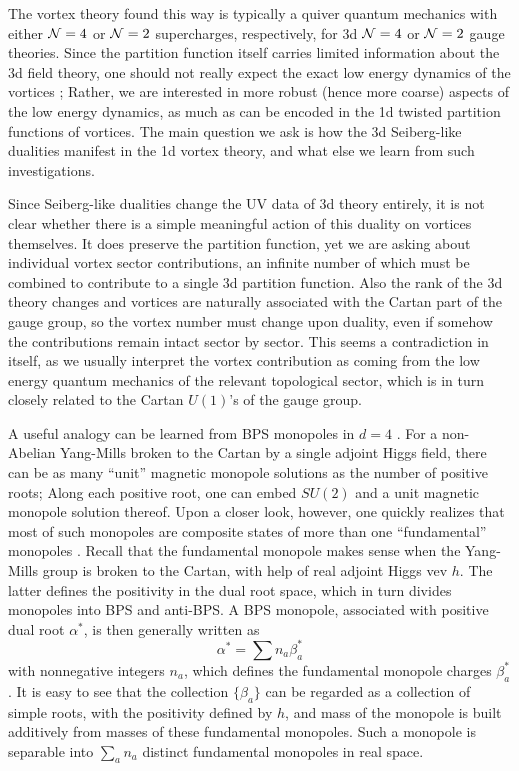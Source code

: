 \documentclass[a4paper,11pt]{article}
\begin{document}
The vortex theory found this way is typically a quiver quantum
mechanics with either ${\cal N}=4$ or ${\cal N}=2$ supercharges,
respectively, for 3d ${\cal N}=4$ or ${\cal N}=2$ gauge theories.
Since the partition function
itself carries limited information about the 3d field
theory, one should not really expect the exact low energy
dynamics of the vortices \cite{Hanany:2003hp};  Rather, we are
interested in more robust (hence more coarse) aspects of the
low energy dynamics, as much as can be encoded in the 1d twisted
partition functions of vortices. The main question we ask
is how the 3d Seiberg-like dualities manifest in the
1d vortex theory, and what else we learn from such
investigations.

Since Seiberg-like dualities change the UV data of 3d
theory entirely, it is not clear whether there is a simple
meaningful action of this duality on vortices themselves.
It does preserve the partition function, yet we are asking
about individual vortex sector contributions, an infinite number
of which must be combined to contribute to a single 3d
partition function. Also the rank of the 3d theory changes
and vortices are naturally associated with the Cartan
part of the gauge group, so the vortex number must change
upon duality, even if somehow the contributions remain
intact sector by sector. This seems a contradiction in
itself, as we usually interpret the vortex contribution
as coming from the low energy quantum mechanics of the
relevant topological sector, which is in turn closely
related to the Cartan $U(1)$'s of the gauge group.

A useful analogy can be learned from BPS monopoles in $d=4$ \cite{Weinberg:1982ev,Weinberg:2006rq}.
For a non-Abelian Yang-Mills broken to the Cartan by a single
adjoint Higgs field, there can be as many ``unit'' magnetic
monopole solutions as the number of positive roots; Along
each positive root, one can embed $SU(2)$ and a unit
magnetic monopole solution thereof. Upon a closer look, however,
one quickly realizes that most of such monopoles are
composite states of more than one ``fundamental'' monopoles \cite{Weinberg:1982ev}.
Recall that
the fundamental monopole makes sense when the Yang-Mills group is
broken to the Cartan, with help of real adjoint Higgs vev $h$.
The latter defines the positivity in the dual root space, which
in turn divides monopoles into BPS and anti-BPS. A BPS monopole,
associated with positive dual root $\alpha^*$, is then generally
written as
$$\alpha^*= \sum n_a \beta^*_a$$
with nonnegative integers $n_a$, which defines the fundamental
monopole charges $\beta^*_a$. It is easy to see that the
collection $\{\beta_a\}$ can be regarded as a collection of
simple roots, with the positivity defined by $h$, and mass of the
monopole is built additively from masses of these
fundamental monopoles. Such a monopole is separable into $\sum_a n_a$
distinct fundamental monopoles in real space.
\end{document}
